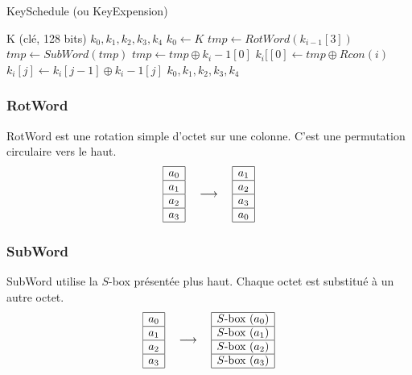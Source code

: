 \begin{algorithm}
    \caption{KeySchedule (ou KeyExpension)}\label{algorithme KeySchedule}
    \begin{algorithmic}
    \Require K (clé, 128 bits)
    \Ensure $ k_0, k_{1}, k_{2}, k_{3}, k_4 $ 
    \State $k_0 \gets K$ 
     
        \State $tmp \gets RotWord(k_{i-1}[3])$
        \State $tmp \gets SubWord(tmp)$
        \State $tmp \gets tmp \oplus k_i-1[0] $
        \State $k_i[[0] \gets tmp \oplus Rcon(i)$
            \State $k_i[j] \gets k_i[j-1] \oplus k_i-1[j]$
        \EndFor
    \EndFor
    \State \Return $k_0, k_{1}, k_{2}, k_{3}, k_4$
    \end{algorithmic}
\end{algorithm}

\subsubsection{RotWord}
RotWord est une rotation simple d'octet sur une colonne. C'est une permutation circulaire vers le haut.
$$ 
\begin{array}{|c|}\hline
  a_{0} \\ \hline
  a_{1} \\ \hline
  a_{2} \\ \hline
  a_{3} \\ \hline
\end{array}  \quad \longrightarrow \quad
\begin{array}{|c|} \hline
  a_{1} \\ \hline
  a_{2} \\ \hline
  a_{3} \\ \hline
  a_{0} \\ \hline
\end{array}$$

\subsubsection{SubWord}
SubWord utilise la $S$-box présentée plus haut. Chaque octet est substitué à un autre octet. 
$$
\begin{array}{|c|}\hline
  a_{0} \\ \hline
  a_{1} \\ \hline
  a_{2} \\ \hline
  a_{3} \\ \hline
\end{array}  \quad \longrightarrow \quad
\begin{array}{|c|} \hline
  S\text{-box } (a_{0}) \\ \hline
  S\text{-box } (a_{1}) \\ \hline
  S\text{-box } (a_{2}) \\ \hline
  S\text{-box } (a_{3}) \\ \hline
\end{array}$$

